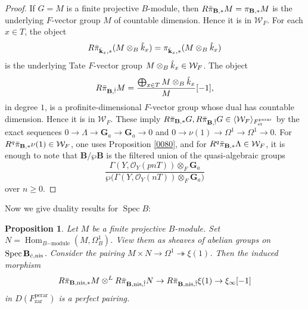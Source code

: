 \documentclass{amsart}
\newtheorem{Prop}[Thm]{Proposition}
\theoremstyle{remark}
\numberwithin{equation}{subsection}
\newcommand{\Order}{\mathcal{O}}
\newcommand{\onto}{\twoheadrightarrow}
\newcommand{\tensor}{\mathbin{\otimes}}
\newcommand{\et}{\mathrm{et}}
\newcommand{\zar}{\mathrm{zar}}
\newcommand{\Ga}{\mathbf{G}_{a}}
\newcommand{\perar}{\mathrm{perar}}
\newcommand{\alg}[1]{\mathbf{#1}}
\newcommand{\nis}{\mathrm{nis}}
\newcommand{\genby}[1]{\langle #1 \rangle}
\DeclareMathOperator{\Hom}{Hom}
\DeclareMathOperator{\Spec}{Spec}
\begin{document}
\begin{proof}
	If $G = M$ is a finite projective $B$-module,
	then $R \Bar{\pi}_{\alg{B}, \ast} M = \pi_{\alg{B}, \ast} M$ is
	the underlying $F$-vector group $M$ of countable dimension.
	Hence it is in $\mathcal{W}_{F}$.
	For each $x \in T$,
	the object
		\[
				R \Bar{\pi}_{\Hat{\alg{k}}_{x}, \ast}(M \tensor_{B} \Hat{k}_{x})
			=
				\pi_{\Hat{\alg{k}}_{x}, \ast}(M \tensor_{B} \Hat{k}_{x})
		\]
	is the underlying Tate $F$-vector group $M \tensor_{B} \Hat{k}_{x} \in \mathcal{W}_{F}$.
	The object
		\[
				R \Bar{\pi}_{\alg{B}, \Hat{!}} M
			=
				\frac{
					\bigoplus_{x \in T}
						M \tensor_{B} \Hat{k}_{x}
				}{
					M
				}[-1],
		\]
	in degree $1$, is a profinite-dimensional $F$-vector group whose dual has countable dimension.
	Hence it is in $\mathcal{W}_{F}$.
	These imply
		$
				R \Bar{\pi}_{\alg{B}, \ast} G,
				R \Bar{\pi}_{\alg{B}, \Hat{!}} G
			\in
				\genby{\mathcal{W}_{F}}_{F^{\perar}_{\et}}
		$
	by the exact sequences
	$0 \to \Lambda \to \Ga \to \Ga \to 0$
	and $0 \to \nu(1) \to \Omega^{1} \to \Omega^{1} \to 0$.
	For $R^{q} \Bar{\pi}_{\alg{B}, \ast} \nu(1) \in \mathcal{W}_{F}$,
	one uses Proposition \ref{0080},
	and for $R^{q} \Bar{\pi}_{\alg{B}, \ast} \Lambda \in \mathcal{W}_{F}$,
	it is enough to note that $\alg{B} / \wp \alg{B}$ is the filtered union of
	the quasi-algebraic groups
		\[
			\frac{
				\Gamma(Y, \Order_{Y}(p n T)) \tensor_{F} \Ga
			}{
				\wp \bigl(
					\Gamma(Y, \Order_{Y}(n T)) \tensor_{F} \Ga
				\bigr)
			}
		\]
	over $n \ge 0$.
\end{proof}

Now we give duality results for $\Spec B$:

\begin{Prop} \label{0086}
	Let $M$ be a finite projective $B$-module.
	Set $N = \Hom_{B\mathrm{-module}}(M, \Omega_{B}^{1})$.
	View them as sheaves of abelian groups on $\Spec \alg{B}_{\Hat{c}, \nis}$.
	Consider the pairing $M \times N \to \Omega^{1} \onto \xi(1)$.
	Then the induced morphism
		\[
					R \Bar{\pi}_{\alg{B}, \nis, \ast} M
				\tensor^{L}
					R \Bar{\pi}_{\alg{B}, \nis, \Hat{!}} N
			\to
				R \Bar{\pi}_{\alg{B}, \nis, \Hat{!}} \xi(1)
			\to
				\xi_{\infty}[-1]
		\]
	in $D(F^{\perar}_{\zar})$ is a perfect pairing.
\end{Prop}
\end{document}
